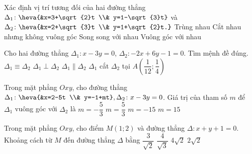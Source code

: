 	\begin{ex}%
		Xác định vị trí tương đối của hai đường thẳng $\Delta_1 \colon \heva{&x=3+\sqrt{2}t \\& y=1-\sqrt{3}t}$ và $\Delta_2 \colon \heva{&x=2+\sqrt{3}t \\& y=1+\sqrt{2}t.}$
		\choice
		{Trùng nhau}
		{Cắt nhau nhưng không vuông góc}
		{Song song với nhau}
		{\True Vuông góc với nhau}
	\end{ex}
	\begin{ex}%
		Cho hai đường thẳng $\Delta_1 \colon x-3y=0$, $\Delta_2 \colon -2x+6y-1=0$. Tìm mệnh đề đúng.
		\choice
		{$\Delta_1 \equiv \Delta_2$}
		{$\Delta_1 \perp \Delta_2$}
		{\True $\Delta_1 \parallel \Delta_2$}
		{$\Delta_1$ cắt $\Delta_2$ tại $A\left(\dfrac{1}{12};\dfrac{1}{4}\right)$}
	\end{ex}
	\begin{ex}%
		Trong mặt phẳng $Oxy$, cho đường thẳng $\Delta_1 \colon \heva{&x=2-5t \\& y=-1+mt}, \Delta_2 \colon x-3y=0$. Giá trị của tham số $m$ để $\Delta_1$ vuông góc với $\Delta_2$ là
		\choice
		{$m=-\dfrac{5}{3}$}
		{$m=\dfrac{5}{3}$}
		{$m=-15$}
		{\True $m=15$}
	\end{ex}
	
	\begin{ex}%
		Trong mặt phẳng $Oxy$, cho điểm $M(1;2)$ và đường thẳng $\Delta\colon x + y + 1 = 0$. Khoảng cách từ $M$ đến đường thẳng $\Delta$ bằng
		\choice
		{$\dfrac{3}{\sqrt{2}}$}
		{$\dfrac{4}{\sqrt{3}}$}
		{$4\sqrt{2}$}
		{\True $2\sqrt{2}$}
	\end{ex}
	
